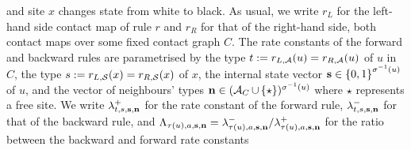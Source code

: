 and site $x$ changes state from white to black.
As usual, we write $r_L$ for the left-hand side contact map of rule $r$
and $r_R$ for that of the right-hand side,
both contact maps over some fixed contact graph $C$.
The rate constants of the forward and backward rules are parametrised
by the type $t := r_{L,\mathcal{A}}(u) = r_{R,\mathcal{A}}(u)$ of $u$ in $C$,
the type $s := r_{L,\mathcal{S}}(x) = r_{R,\mathcal{S}}(x)$ of $x$,
the internal state vector
$\boldsymbol{\mathbf{s}} \in \left\{ 0,1 \right\}^{\sigma^{-1}(u)}$ of $u$,
and the vector of neighbours' types
$\boldsymbol{\mathbf{n}} \in (\mathcal{A}_C \operatorname*{\cup} \left\{ \star \right\})^{\sigma^{-1}(u)}$
where $\star$ represents a free site.
We write $\lambda^+_{t,s,\boldsymbol{\mathbf{s}},\boldsymbol{\mathbf{n}}}$
for the rate constant of the forward rule,
$\lambda^-_{t,s,\boldsymbol{\mathbf{s}},\boldsymbol{\mathbf{n}}}$
for that of the backward rule,
and $\Lambda_{\tau(u),a,\boldsymbol{\mathbf{s}},\boldsymbol{\mathbf{n}}} =
\lambda^-_{\tau(u),a,\boldsymbol{\mathbf{s}},\boldsymbol{\mathbf{n}}}/
\lambda^+_{\tau(u),a,\boldsymbol{\mathbf{s}},\boldsymbol{\mathbf{n}}}$ for the ratio
between the backward and forward rate constants %







